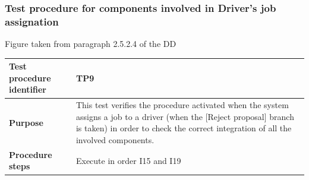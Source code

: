 \documentclass[a4paper,11pt]{report} %
\begin{document}
			\subsubsection{Test procedure for components involved in Driver's job assignation}
				\begin{minipage}{\linewidth}
				\end{minipage}
				\begin{center}
					Figure taken from paragraph 2.5.2.4 of the DD
				\end{center} 			
				\begin{center}
					\begin{tabular}{| l | p{9.5cm} |}\hline
						\textbf{Test procedure identifier} & TP9\\\hline
												\textbf{Purpose} & This test verifies the procedure activated when the system assigns a job to a driver (when the [Reject proposal] branch is taken) in order to check the correct integration of all the involved components.\\\hline
												\textbf{Procedure steps} & Execute in order I15 and I19 \\\hline
					\end{tabular}
				\end{center}	
\end{document}
